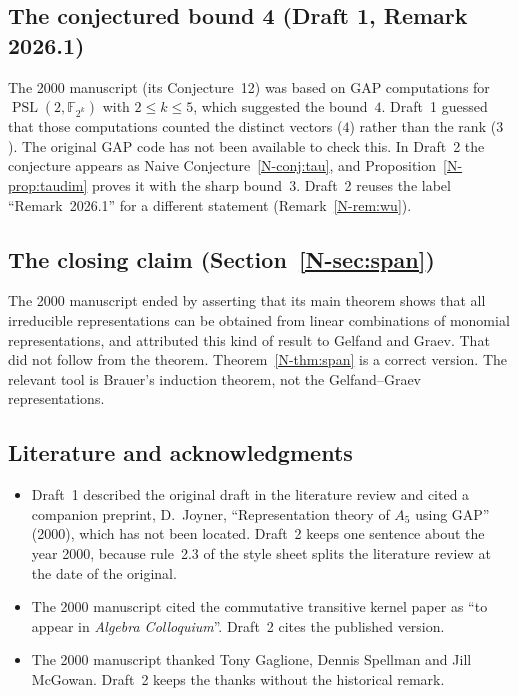 \documentclass[12pt,letterpaper]{article}
\newcommand{\F}{\mathbb{F}}
\DeclareMathOperator{\PSL}{PSL}
\begin{document}
\subsection{The conjectured bound 4 (Draft 1, Remark 2026.1)}
The 2000 manuscript (its Conjecture~12) was based on GAP computations for
$\PSL(2,\F_{2^k})$ with $2\le k\le5$, which suggested the bound~$4$. Draft~1
guessed that those computations counted the distinct vectors ($4$) rather
than the rank ($3$). The original GAP code has not been available to check
this. In Draft~2 the conjecture appears as Naive
Conjecture~\ref{N-conj:tau}, and Proposition~\ref{N-prop:taudim} proves it
with the sharp bound~$3$. Draft~2 reuses the label ``Remark~2026.1'' for a
different statement (Remark~\ref{N-rem:wu}).

\subsection{The closing claim (Section~\ref{N-sec:span})}
The 2000 manuscript ended by asserting that its main theorem shows that all
irreducible representations can be obtained from linear combinations of
monomial representations, and attributed this kind of result to Gelfand and
Graev. That did not follow from the theorem. Theorem~\ref{N-thm:span} is a
correct version. The relevant tool is Brauer's induction theorem, not the
Gelfand--Graev representations.

\subsection{Literature and acknowledgments}
\begin{itemize}[itemsep=1pt]
\item Draft~1 described the original draft in the literature review and
  cited a companion preprint, D.~Joyner, ``Representation theory of $A_5$
  using GAP'' (2000), which has not been located. Draft~2 keeps one sentence
  about the year 2000, because rule~2.3 of the style sheet splits the
  literature review at the date of the original.
\item The 2000 manuscript cited the commutative transitive kernel paper as
  ``to appear in \emph{Algebra Colloquium}''. Draft~2 cites the published
  version.
\item The 2000 manuscript thanked Tony Gaglione, Dennis Spellman and Jill
  McGowan. Draft~2 keeps the thanks without the historical remark.
\end{itemize}
\end{document}
